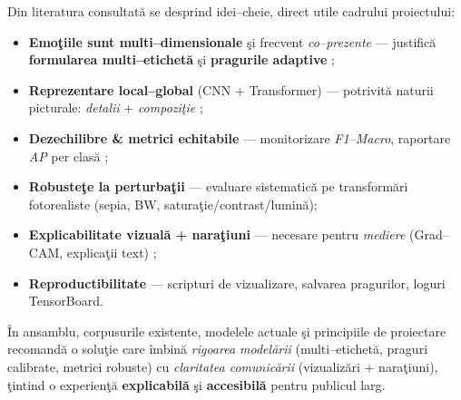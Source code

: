 Din literatura consultată se desprind idei–cheie, direct utile cadrului proiectului:
\begin{itemize}[leftmargin=*, itemsep=2pt, topsep=2pt]
  \item \textbf{Emoţiile sunt multi–dimensionale} şi frecvent \emph{co–prezente} — justifică \textbf{formularea multi–etichetă} şi \textbf{pragurile adaptive} \cite{zhang2014review,lin2017focal};
  \item \textbf{Reprezentare local–global} (CNN + Transformer) — potrivită naturii picturale: \emph{detalii} + \emph{compoziţie} \cite{tan2019efficientnet,dosovitskiy2020image,liu2021swin};
  \item \textbf{Dezechilibre \& metrici echitabile} — monitorizare \emph{F1–Macro}, raportare \emph{AP} per clasă \cite{buda2018systematic};
  \item \textbf{Robusteţe la perturbaţii} — evaluare sistematică pe transformări fotorealiste (sepia, BW, saturaţie/contrast/lumină);
  \item \textbf{Explicabilitate vizuală + naraţiuni} — necesare pentru \emph{mediere} (Grad–CAM, explicaţii text) \cite{selvaraju2017grad,achlioptas2021artemis};
  \item \textbf{Reproductibilitate} — scripturi de vizualizare, salvarea pragurilor, loguri TensorBoard.
\end{itemize}

\medskip
\noindent În ansamblu, corpusurile existente, modelele actuale şi principiile de proiectare recomandă o soluţie care îmbină \emph{rigoarea modelării} (multi–etichetă, praguri calibrate, metrici robuste) cu \emph{claritatea comunicării} (vizualizări + naraţiuni), ţintind o experienţă \textbf{explicabilă} şi \textbf{accesibilă} pentru publicul larg.

